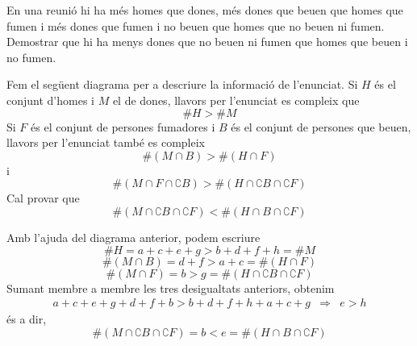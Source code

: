 \begin{exer}
En una reuni\'{o} hi ha m\'{e}s homes que dones, m\'{e}s dones que beuen que
homes que fumen i m\'{e}s dones que fumen i no beuen que homes que no beuen
ni fumen. Demostrar que hi ha menys dones que no beuen ni fumen que homes
que beuen i no fumen.
\end{exer}

\begin{solucio}
Fem el seg\"{u}ent diagrama per a descriure la informaci\'{o} de l'enunciat.%
Si $H$ \'{e}s el
conjunt d'homes i $M$ el de dones, llavors per l'enunciat es compleix que%
\begin{equation*}
\#H>\#M
\end{equation*}%
Si $F$ \'{e}s el conjunt de persones fumadores i $B$ \'{e}s el conjunt de
persones que beuen, llavors per l'enunciat tamb\'{e} es compleix%
\begin{equation*}
\#\left( M\cap B\right) >\#\left( H\cap F\right)
\end{equation*}%
i%
\begin{equation*}
\#\left( M\cap F\cap \complement B\right) >\#\left( H\cap \complement B\cap
\complement F\right)
\end{equation*}%
Cal provar que%
\begin{equation*}
\#\left( M\cap \complement B\cap \complement F\right) <\#\left( H\cap B\cap
\complement F\right)
\end{equation*}

Amb l'ajuda del diagrama anterior, podem escriure%
\begin{equation*}
\#H=a+c+e+g>b+d+f+h=\#M
\end{equation*}%
\begin{equation*}
\#\left( M\cap B\right) =d+f>a+c=\#\left( H\cap F\right)
\end{equation*}%
\begin{equation*}
\#\left( M\cap F\right) =b>g=\#\left( H\cap \complement B\cap \complement
F\right)
\end{equation*}%
Sumant membre a membre les tres desigualtats anteriors, obtenim%
\begin{equation*}
\begin{array}{ccc}
a+c+e+g+d+f+b>b+d+f+h+a+c+g & \Longrightarrow & e>h%
\end{array}%
\end{equation*}%
\'{e}s a dir,%
\begin{equation*}
\#\left( M\cap \complement B\cap \complement F\right) =b<e=\#\left( H\cap
B\cap \complement F\right)
\end{equation*}
\end{solucio}


